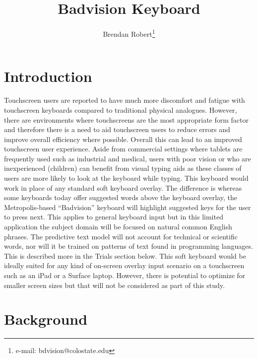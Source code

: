 \documentclass[english]{vgtc}
\author{Brendan Robert\thanks{e-mail: bdvision@colostate.edu}}
\begin{document}
\title{Badvision Keyboard}
\maketitle

\section{Introduction}

Touchscreen users are reported to have much more discomfort and fatigue
with touchscreen keyboards \cite{chaparro13} compared to traditional
physical analogues. However, there are environments where touchscreens
are the most appropriate form factor and therefore there is a need
to aid touchscreen users to reduce errors and improve overall efficiency
where possible. Overall this can lead to an improved touchscreen user
experience. Aside from commercial settings where tablets are frequently
used such as industrial and medical, users with poor vision or who
are inexperienced (children) can benefit from visual typing aids as
these classes of users are more likely to look at the keyboard while
typing. \cite{alhabri19} This keyboard would work in place of any
standard soft keyboard overlay. The difference is whereas some keyboards
today offer suggested words above the keyboard overlay, the Metropolis-based
\textquotedblleft Badvision\textquotedblright{} keyboard will highlight
suggested keys for the user to press next. This applies to general
keyboard input but in this limited application the subject domain
will be focused on natural common English phrases. The predictive
text model will not account for technical or scientific words, nor
will it be trained on patterns of text found in programming languages.
This is described more in the Trials section below. This soft keyboard
would be ideally suited for any kind of on-screen overlay input scenario
on a touchscreen such as an iPad or a Surface laptop. However, there
is potential to optimize for smaller screen sizes but that will not
be considered as part of this study.

\section{Background}
\end{document}

